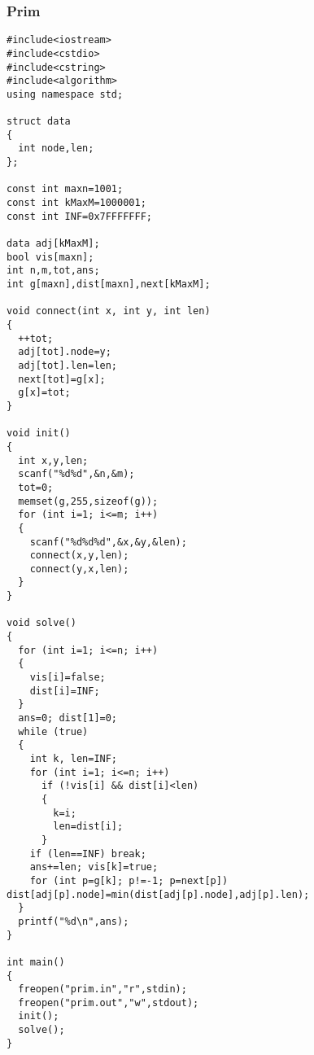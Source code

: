 \subsubsection{Prim}
\begin{verbatim}
#include<iostream>
#include<cstdio>
#include<cstring>
#include<algorithm>
using namespace std;

struct data
{
  int node,len;
};

const int maxn=1001;
const int kMaxM=1000001;
const int INF=0x7FFFFFFF;

data adj[kMaxM];
bool vis[maxn];
int n,m,tot,ans;
int g[maxn],dist[maxn],next[kMaxM];

void connect(int x, int y, int len)
{
  ++tot;
  adj[tot].node=y;
  adj[tot].len=len;
  next[tot]=g[x];
  g[x]=tot;
}

void init()
{
  int x,y,len;
  scanf("%d%d",&n,&m);
  tot=0;
  memset(g,255,sizeof(g));
  for (int i=1; i<=m; i++)
  {
    scanf("%d%d%d",&x,&y,&len);
    connect(x,y,len);
    connect(y,x,len);
  }
}

void solve()
{
  for (int i=1; i<=n; i++)
  {
    vis[i]=false;
    dist[i]=INF;
  }
  ans=0; dist[1]=0;
  while (true)
  {
    int k, len=INF;
    for (int i=1; i<=n; i++)
      if (!vis[i] && dist[i]<len)
      {
        k=i;
        len=dist[i];
      }
    if (len==INF) break;
    ans+=len; vis[k]=true;
    for (int p=g[k]; p!=-1; p=next[p]) dist[adj[p].node]=min(dist[adj[p].node],adj[p].len);
  }
  printf("%d\n",ans);
}

int main()
{
  freopen("prim.in","r",stdin);
  freopen("prim.out","w",stdout);
  init();
  solve();
}
\end{verbatim}
